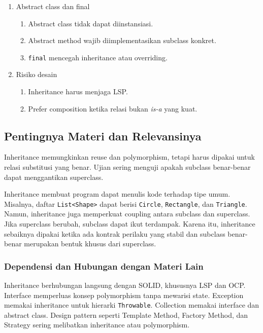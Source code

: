 \begin{enumerate}
\begin{enumerate}
    \end{enumerate}
    \item Abstract class dan final
    \begin{enumerate}
        \item Abstract class tidak dapat diinstansiasi.
        \item Abstract method wajib diimplementasikan subclass konkret.
        \item \texttt{final} mencegah inheritance atau overriding.
    \end{enumerate}
    \item Risiko desain
    \begin{enumerate}
        \item Inheritance harus menjaga LSP.
        \item Prefer composition ketika relasi bukan \textit{is-a} yang kuat.
    \end{enumerate}
\end{enumerate}

\subsection{Pentingnya Materi dan Relevansinya}

\begin{jawab}
Inheritance memungkinkan reuse dan polymorphism, tetapi harus dipakai untuk relasi substitusi yang benar. Ujian sering menguji apakah subclass benar-benar dapat menggantikan superclass.
\end{jawab}

Inheritance membuat program dapat menulis kode terhadap tipe umum. Misalnya, daftar \texttt{List<Shape>} dapat berisi \texttt{Circle}, \texttt{Rectangle}, dan \texttt{Triangle}. Namun, inheritance juga memperkuat coupling antara subclass dan superclass. Jika superclass berubah, subclass dapat ikut terdampak. Karena itu, inheritance sebaiknya dipakai ketika ada kontrak perilaku yang stabil dan subclass benar-benar merupakan bentuk khusus dari superclass.

\subsubsection{Dependensi dan Hubungan dengan Materi Lain}

Inheritance berhubungan langsung dengan SOLID, khususnya LSP dan OCP. Interface memperluas konsep polymorphism tanpa mewarisi state. Exception memakai inheritance untuk hierarki \texttt{Throwable}. Collection memakai interface dan abstract class. Design pattern seperti Template Method, Factory Method, dan Strategy sering melibatkan inheritance atau polymorphism.

